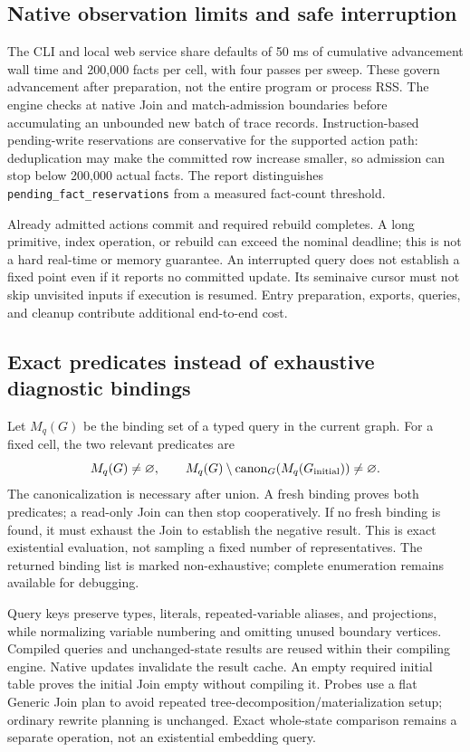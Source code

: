 \documentclass[11pt,a4paper]{article}
\newcommand{\code}[1]{\texttt{#1}}
\begin{document}
\subsection{Native observation limits and safe interruption}
The CLI and local web service share defaults of 50 ms of cumulative advancement
wall time and 200,000 facts per cell, with four passes per sweep. These govern
advancement after preparation, not the entire program or process RSS. The engine
checks at native Join and match-admission boundaries before accumulating an
unbounded new batch of trace records. Instruction-based pending-write reservations
are conservative for the supported action path: deduplication may make the
committed row increase smaller, so admission can stop below 200,000 actual facts.
The report distinguishes \code{pending\_fact\_reservations} from a measured
fact-count threshold.

Already admitted actions commit and required rebuild completes. A long primitive,
index operation, or rebuild can exceed the nominal deadline; this is not a hard
real-time or memory guarantee. An interrupted query does not establish a fixed
point even if it reports no committed update. Its seminaive cursor must not skip
unvisited inputs if execution is resumed. Entry preparation, exports, queries,
and cleanup contribute additional end-to-end cost.
\NativeStopFigure

\subsection{Exact predicates instead of exhaustive diagnostic bindings}
Let $M_q(G)$ be the binding set of a typed query in the current graph. For a fixed
cell, the two relevant predicates are
\begin{equation}
 M_q(G)\ne\varnothing,\qquad
 M_q(G)\setminus\operatorname{canon}_{G}(M_q(G_{\rm initial}))\ne\varnothing.
\end{equation}
The canonicalization is necessary after union. A fresh binding proves both
predicates; a read-only Join can then stop cooperatively. If no fresh binding is
found, it must exhaust the Join to establish the negative result. This is exact
existential evaluation, not sampling a fixed number of representatives. The
returned binding list is marked non-exhaustive; complete enumeration remains
available for debugging.

Query keys preserve types, literals, repeated-variable aliases, and projections,
while normalizing variable numbering and omitting unused boundary vertices.
Compiled queries and unchanged-state results are reused within their compiling
engine. Native updates invalidate the result cache. An empty required initial
table proves the initial Join empty without compiling it. Probes use a flat
Generic Join plan to avoid repeated tree-decomposition/materialization setup;
ordinary rewrite planning is unchanged. Exact whole-state comparison remains a
separate operation, not an existential embedding query.
\end{document}
